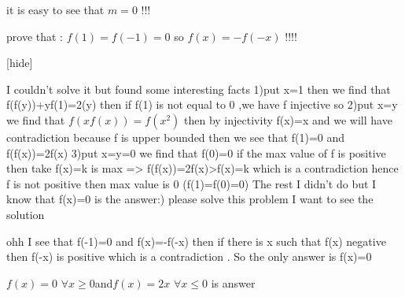 \begin{solution}

it is easy to see that $m=0$ !!!

prove that : $f(1)=f(-1)=0$ so $f(x)=-f(-x)$ !!!!

[\/hide]
\end{solution}



\begin{solution}
	I couldn't solve it but found some interesting facts
1)put x=1 then we find that 
f(f(y))+yf(1)=2(y) then if f(1) is not equal to 0 ,we have f injective so 
2)put x=y we find that $f(xf(x))=f(x^2)$ then by injectivity f(x)=x and we will have contradiction because f is upper bounded
then we see that f(1)=0 and f(f(x))=2f(x) 
3)put x=y=0 we find that f(0)=0
if the max value of f is positive then take f(x)=k is max => f(f(x))=2f(x)>f(x)=k which is a contradiction 
hence f is not positive then max value is 0 (f(1)=f(0)=0)
The rest I didn't do but I know that f(x)=0 is the answer:)
please solve this problem I want to see the solution
\end{solution}



\begin{solution}
	ohh I see that f(-1)=0 and f(x)=-f(-x) then if there is x such that f(x) negative then f(-x) is positive which is a contradiction . So the only answer is f(x)=0
\end{solution}



\begin{solution}
	$f(x)=0$  $\forall{x\geq{0}}$and$f(x)=2x$  $\forall{x\leq{0}}$ is answer
\end{solution}



